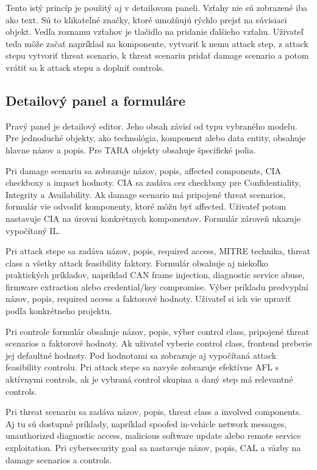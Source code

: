 \documentclass[11pt]{article}
\begin{document}
Tento istý princíp je použitý aj v detailovom paneli. Vzťahy nie sú zobrazené iba ako text. Sú to klikateľné značky, ktoré umožňujú rýchlo prejsť na súvisiaci objekt. Vedľa zoznamu vzťahov je tlačidlo na pridanie ďalšieho vzťahu. Uživateľ teda môže začať napríklad na komponente, vytvoriť k nemu attack step, z attack stepu vytvoriť threat scenario, k threat scenariu pridať damage scenario a potom vrátiť sa k attack stepu a doplniť controls.

\subsection{Detailový panel a formuláre}

Pravý panel je detailový editor. Jeho obsah závisí od typu vybraného modelu. Pre jednoduché objekty, ako technológia, komponent alebo data entity, obsahuje hlavne názov a popis. Pre TARA objekty obsahuje špecifické polia.

Pri damage scenariu sa zobrazuje názov, popis, affected components, CIA checkboxy a impact hodnoty. CIA sa zadáva cez checkboxy pre Confidentiality, Integrity a Availability. Ak damage scenario má pripojené threat scenarios, formulár vie odvodiť komponenty, ktoré môžu byť affected. Uživateľ potom nastavuje CIA na úrovni konkrétnych komponentov. Formulár zároveň ukazuje vypočítaný IL.

Pri attack stepe sa zadáva názov, popis, required access, MITRE technika, threat class a všetky attack feasibility faktory. Formulár obsahuje aj niekoľko praktických príkladov, napríklad CAN frame injection, diagnostic service abuse, firmware extraction alebo credential/key compromise. Výber príkladu predvyplní názov, popis, required access a faktorové hodnoty. Uživateľ si ich vie upraviť podľa konkrétneho projektu.

Pri controle formulár obsahuje názov, popis, výber control class, pripojené threat scenarios a faktorové hodnoty. Ak uživateľ vyberie control class, frontend preberie jej defaultné hodnoty. Pod hodnotami sa zobrazuje aj vypočítaná attack feasibility controlu. Pri attack stepe sa navyše zobrazuje efektívne AFL s aktívnymi controls, ak je vybraná control skupina a daný step má relevantné controls.

Pri threat scenariu sa zadáva názov, popis, threat class a involved components. Aj tu sú dostupné príklady, napríklad spoofed in-vehicle network messages, unauthorized diagnostic access, malicious software update alebo remote service exploitation. Pri cybersecurity goal sa nastavuje názov, popis, CAL a väzby na damage scenarios a controls.
\end{document}
